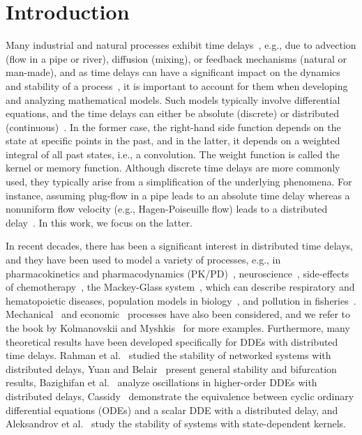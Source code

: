 \section{Introduction}\label{sec:intro}
Many industrial and natural processes exhibit time delays~\cite{Kolmanovskii:Myshkis:1992}, e.g., due to advection (flow in a pipe or river), diffusion (mixing), or feedback mechanisms (natural or man-made), and as time delays can have a significant impact on the dynamics and stability of a process~\cite{Niculescu:Gu:2004}, it is important to account for them when developing and analyzing mathematical models. Such models typically involve differential equations, and the time delays can either be absolute (discrete) or distributed (continuous)~\cite{Smith:2011}. In the former case, the right-hand side function depends on the state at specific points in the past, and in the latter, it depends on a weighted integral of all past states, i.e., a convolution. The weight function is called the kernel or memory function. Although discrete time delays are more commonly used, they typically arise from a simplification of the underlying phenomena. For instance, assuming plug-flow in a pipe leads to an absolute time delay whereas a nonuniform flow velocity (e.g., Hagen-Poiseuille flow) leads to a distributed delay~\cite{Ritschel:2024}. In this work, we focus on the latter.

In recent decades, there has been a significant interest in distributed time delays, and they have been used to model a variety of processes, e.g., in pharmacokinetics and pharmacodynamics (PK/PD)~\cite{Hu:etal:2018}, neuroscience~\cite{Darabsah:etal:2024}, side-effects of chemotherapy~\cite{Krzyzanski:etal:2018}, the Mackey-Glass system~\cite{Nevermann:Gros:2023, Zhang:Xiao:2016}, which can describe respiratory and hematopoietic diseases, population models in biology~\cite{Cassidy:etal:2019}, and pollution in fisheries~\cite{Bergland:etal:2022}. Mechanical~\cite{Aleksandrov:etal:2023} and economic~\cite{Guerrini:etal:2020} processes have also been considered, and we refer to the book by Kolmanovskii and Myshkis~\cite{Kolmanovskii:Myshkis:1992} for more examples.
%
Furthermore, many theoretical results have been developed specifically for DDEs with distributed time delays. Rahman et al.~\cite{Rahman:etal:2015} studied the stability of networked systems with distributed delays, Yuan and Belair~\cite{Yuan:Belair:2011} present general stability and bifurcation results, Bazighifan et al.~\cite{Bazighifan:etal:2019} analyze oscillations in higher-order DDEs with distributed delays, Cassidy~\cite{Cassidy:2021} demonstrate the equivalence between cyclic ordinary differential equations (ODEs) and a scalar DDE with a distributed delay, and Aleksandrov et al.~\cite{Aleksandrov:etal:2024} study the stability of systems with state-dependent kernels.

